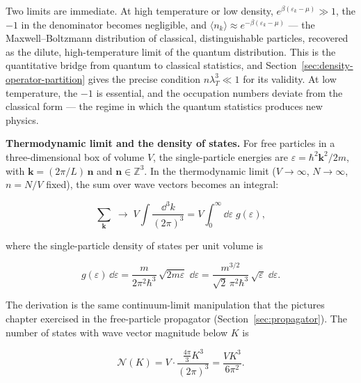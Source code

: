 Two limits are immediate. At high temperature or low density, $e^{\beta(\varepsilon_k - \mu)} \gg 1$, the $-1$ in the denominator becomes negligible, and $\langle n_k \rangle \approx e^{-\beta(\varepsilon_k - \mu)}$ --- the Maxwell--Boltzmann distribution of classical, distinguishable particles, recovered as the dilute, high-temperature limit of the quantum distribution. This is the quantitative bridge from quantum to classical statistics, and Section~\ref{sec:density-operator-partition} gives the precise condition $n\lambda_T^3 \ll 1$ for its validity. At low temperature, the $-1$ is essential, and the occupation numbers deviate from the classical form --- the regime in which the quantum statistics produces new physics.

\medskip\noindent\textbf{Thermodynamic limit and the density of states.}
For free particles in a three-dimensional box of volume $V$, the single-particle energies are $\varepsilon = \hbar^2 \bm k^2 / 2m$, with $\bm k = (2\pi/L)\,\bm n$ and $\bm n \in \mathbb{Z}^3$. In the thermodynamic limit ($V \to \infty$, $N \to \infty$, $n = N/V$ fixed), the sum over wave vectors becomes an integral:
\begin{linenomath}
    \begin{equation*}
        \sum_{\bm k} \;\longrightarrow\; V\int\!\frac{\dd^3 k}{(2\pi)^3}
        = V\int_0^\infty\!\dd\varepsilon\;g(\varepsilon),
    \end{equation*}
\end{linenomath}
where the single-particle density of states per unit volume is
\begin{linenomath}
    \begin{equation}
        g(\varepsilon)\,\dd\varepsilon
        = \frac{m}{2\pi^2\hbar^3}\,\sqrt{2m\varepsilon}\;\dd\varepsilon
        = \frac{m^{3/2}}{\sqrt{2}\,\pi^2\hbar^3}\,\sqrt{\varepsilon}\;\dd\varepsilon.
        \label{eq:density-of-states}
    \end{equation}
\end{linenomath}
The derivation is the same continuum-limit manipulation that the pictures chapter exercised in the free-particle propagator (Section~\ref{sec:propagator}). The number of states with wave vector magnitude below $K$ is
\begin{linenomath}
    \begin{equation*}
        \mathcal{N}(K) = V \cdot \frac{\frac{4\pi}{3}K^3}{(2\pi)^3} = \frac{V K^3}{6\pi^2}.
    \end{equation*}
\end{linenomath}
